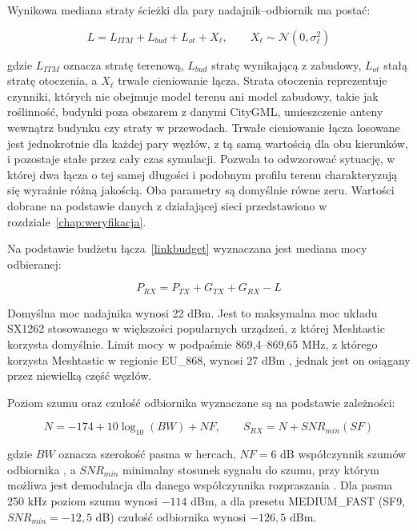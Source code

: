 Wynikowa mediana straty ścieżki dla pary nadajnik--odbiornik ma postać:

\begin{equation}\label{eq:pl_sym}
L = L_{ITM} + L_{bud} + L_{ot} + X_{\ell}, \qquad X_{\ell} \sim \mathcal{N}(0, \sigma_{\ell}^2)
\end{equation}

gdzie \(L_{ITM}\) oznacza stratę terenową, \(L_{bud}\) stratę wynikającą z zabudowy, \(L_{ot}\) stałą stratę otoczenia, a \(X_{\ell}\) trwałe cieniowanie łącza. Strata otoczenia reprezentuje czynniki, których nie obejmuje model terenu ani model zabudowy, takie jak roślinność, budynki poza obszarem z danymi CityGML, umieszczenie anteny wewnątrz budynku czy straty w przewodach. Trwałe cieniowanie łącza losowane jest jednokrotnie dla każdej pary węzłów, z tą samą wartością dla obu kierunków, i pozostaje stałe przez cały czas symulacji. Pozwala to odwzorować sytuację, w której dwa łącza o tej samej długości i podobnym profilu terenu charakteryzują się wyraźnie różną jakością. Oba parametry są domyślnie równe zeru. Wartości dobrane na podstawie danych z działającej sieci przedstawiono w rozdziale~\ref{chap:weryfikacja}.

Na podstawie budżetu łącza~\eqref{linkbudget} wyznaczana jest mediana mocy odbieranej:

\begin{equation}\label{eq:rssi}
P_{RX} = P_{TX} + G_{TX} + G_{RX} - L
\end{equation}

Domyślna moc nadajnika wynosi 22 dBm. Jest to maksymalna moc układu SX1262 \cite{sx1262} stosowanego w większości popularnych urządzeń, z której Meshtastic korzysta domyślnie. Limit mocy w podpaśmie 869,4--869,65 MHz, z którego korzysta Meshtastic w regionie EU\_868, wynosi 27 dBm \cite{etsi300220}, jednak jest on osiągany przez niewielką część węzłów.

Poziom szumu oraz czułość odbiornika wyznaczane są na podstawie zależności:

\begin{equation}\label{eq:szum}
N = -174 + 10\log_{10}(BW) + NF, \qquad S_{RX} = N + SNR_{min}(SF)
\end{equation}

gdzie \(BW\) oznacza szerokość pasma w hercach, \(NF = 6\) dB współczynnik szumów odbiornika \cite{semtech_an1200_22}, a \(SNR_{min}\) minimalny stosunek sygnału do szumu, przy którym możliwa jest demodulacja dla danego współczynnika rozpraszania \cite{sx1262}. Dla pasma 250 kHz poziom szumu wynosi \(-114\) dBm, a dla presetu MEDIUM\_FAST (SF9, \(SNR_{min} = -12{,}5\) dB) czułość odbiornika wynosi \(-126{,}5\) dBm.

